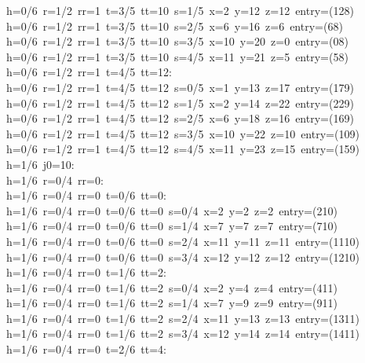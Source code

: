 \begin{tabbing}
h=0/6\ r=1/2\ rr=1\ t=3/5\ tt=10\ s=1/5\ x=2\ y=12\ z=12\ entry=(128)\\[0pt]
h=0/6\ r=1/2\ rr=1\ t=3/5\ tt=10\ s=2/5\ x=6\ y=16\ z=6\ entry=(68)\\[0pt]
h=0/6\ r=1/2\ rr=1\ t=3/5\ tt=10\ s=3/5\ x=10\ y=20\ z=0\ entry=(08)\\[0pt]
h=0/6\ r=1/2\ rr=1\ t=3/5\ tt=10\ s=4/5\ x=11\ y=21\ z=5\ entry=(58)\\[0pt]
h=0/6\ r=1/2\ rr=1\ t=4/5\ tt=12:\\[0pt]
h=0/6\ r=1/2\ rr=1\ t=4/5\ tt=12\ s=0/5\ x=1\ y=13\ z=17\ entry=(179)\\[0pt]
h=0/6\ r=1/2\ rr=1\ t=4/5\ tt=12\ s=1/5\ x=2\ y=14\ z=22\ entry=(229)\\[0pt]
h=0/6\ r=1/2\ rr=1\ t=4/5\ tt=12\ s=2/5\ x=6\ y=18\ z=16\ entry=(169)\\[0pt]
h=0/6\ r=1/2\ rr=1\ t=4/5\ tt=12\ s=3/5\ x=10\ y=22\ z=10\ entry=(109)\\[0pt]
h=0/6\ r=1/2\ rr=1\ t=4/5\ tt=12\ s=4/5\ x=11\ y=23\ z=15\ entry=(159)\\[0pt]
h=1/6\ j0=10:\\[0pt]
h=1/6\ r=0/4\ rr=0:\\[0pt]
h=1/6\ r=0/4\ rr=0\ t=0/6\ tt=0:\\[0pt]
h=1/6\ r=0/4\ rr=0\ t=0/6\ tt=0\ s=0/4\ x=2\ y=2\ z=2\ entry=(210)\\[0pt]
h=1/6\ r=0/4\ rr=0\ t=0/6\ tt=0\ s=1/4\ x=7\ y=7\ z=7\ entry=(710)\\[0pt]
h=1/6\ r=0/4\ rr=0\ t=0/6\ tt=0\ s=2/4\ x=11\ y=11\ z=11\ entry=(1110)\\[0pt]
h=1/6\ r=0/4\ rr=0\ t=0/6\ tt=0\ s=3/4\ x=12\ y=12\ z=12\ entry=(1210)\\[0pt]
h=1/6\ r=0/4\ rr=0\ t=1/6\ tt=2:\\[0pt]
h=1/6\ r=0/4\ rr=0\ t=1/6\ tt=2\ s=0/4\ x=2\ y=4\ z=4\ entry=(411)\\[0pt]
h=1/6\ r=0/4\ rr=0\ t=1/6\ tt=2\ s=1/4\ x=7\ y=9\ z=9\ entry=(911)\\[0pt]
h=1/6\ r=0/4\ rr=0\ t=1/6\ tt=2\ s=2/4\ x=11\ y=13\ z=13\ entry=(1311)\\[0pt]
h=1/6\ r=0/4\ rr=0\ t=1/6\ tt=2\ s=3/4\ x=12\ y=14\ z=14\ entry=(1411)\\[0pt]
h=1/6\ r=0/4\ rr=0\ t=2/6\ tt=4:\\[0pt]

\end{tabbing}
